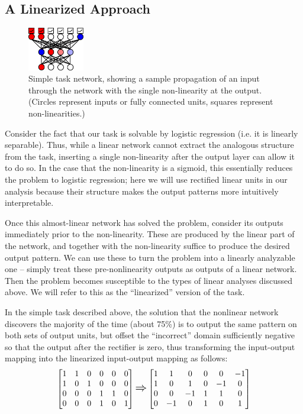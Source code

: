 \documentclass[10pt,letterpaper]{article}
\begin{document}
\subsection{A Linearized Approach}
\begin{figure}[p]
\centering
\includegraphics[width=0.22\textwidth]{figures/network_diagram.png}
\caption{Simple task network, showing a sample propagation of an input through the network with the single non-linearity at the output. (Circles represent inputs or fully connected units, squares represent non-linearities.) }
\label{network_diagram}
\end{figure}
Consider the fact that our task is solvable by logistic regression (i.e. it is linearly separable). Thus, while a linear network cannot extract the analogous structure from the task, inserting a single non-linearity after the output layer can allow it to do so. In the case that the non-linearity is a sigmoid, this essentially reduces the problem to logistic regression; here we will use rectified linear units in our analysis because their structure makes the output patterns more intuitively interpretable. \par 
Once this almost-linear network has solved the problem, consider its outputs immediately prior to the non-linearity. These are produced by the linear part of the network, and together with the non-linearity suffice to produce the desired output pattern. We can use these to turn the problem into a linearly analyzable one -- simply treat these pre-nonlinearity outputs as outputs of a linear network. Then the problem becomes susceptible to the types of linear analyses discussed above. We will refer to this as the ``linearized'' version of the task. \par 
In the simple task described above, the solution that the nonlinear network discovers the majority of the time (about 75\%) is to output the same pattern on both sets of output units, but offset the ``incorrect'' domain sufficiently negative so that the output after the rectifier is zero, thus transforming the input-output mapping into the linearized input-output mapping as follows:
{ 
\[
\left[ \begin{matrix} 
1 & 1 & 0 & 0 & 0 & 0 \\
1 & 0 & 1 & 0 & 0 & 0 \\
 0 & 0 & 0 & 1 & 1 & 0\\
 0 & 0 & 0 & 1 & 0 & 1\\
\end{matrix}  \right] 
\mathlarger{\mathlarger{\Rightarrow}}
\left[ \begin{matrix} 
1 & 1 & 0 & 0 & 0 & -1 \\
1 & 0 & 1 & 0 & -1 & 0 \\
 0 & 0 & -1 & 1 & 1 & 0\\
 0 & -1 & 0 & 1 & 0 & 1\\
\end{matrix}  \right] 
\] }
\end{document}
